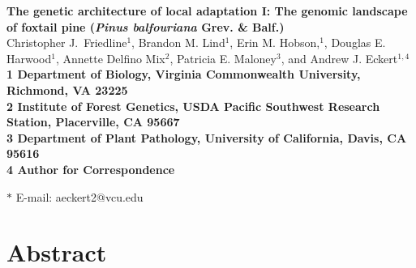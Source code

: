 \documentclass[11pt]{article}
\begin{document}
\begin{flushleft} 
{\Large \textbf{The genetic architecture of local adaptation I: The genomic landscape of 
foxtail pine (\textit{Pinus balfouriana} Grev. \& Balf.)}}
\\
Christopher J.\ Friedline$^{1}$, 
Brandon M. Lind$^{1}$,
Erin M. Hobson,$^{1}$,
Douglas E. Harwood$^{1}$, 
Annette Delfino Mix$^{2}$,
Patricia E. Maloney$^{3}$, and
Andrew J. Eckert$^{1,4}$
\\
\bf{1} Department of Biology, Virginia Commonwealth University, Richmond, VA 23225
\\
\bf{2} Institute of Forest Genetics, USDA Pacific Southwest Research Station, Placerville, 
CA 95667
\\
\bf{3} Department of Plant Pathology, University of California, Davis, CA 95616
\\
\bf{4} Author for Correspondence

$\ast$ E-mail: aeckert2@vcu.edu
\end{flushleft}

\section{Abstract}
\end{document}
